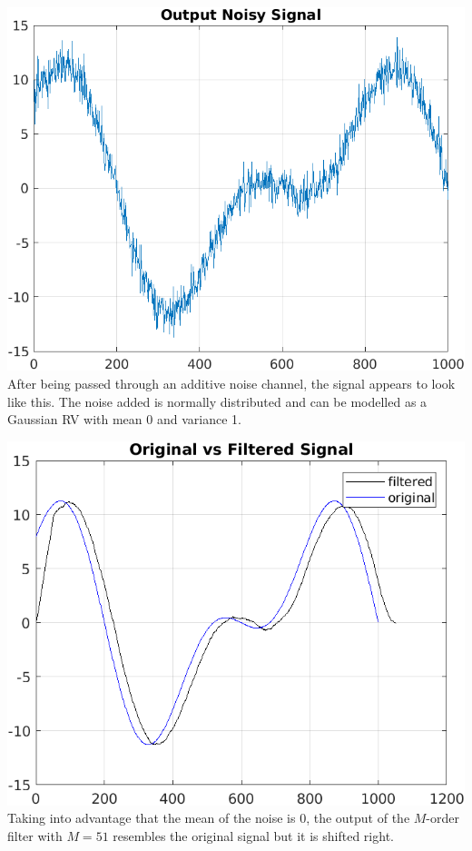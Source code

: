 \documentclass[10pt,twocolumn,letterpaper]{article}
\begin{document}
\begin{center}
    \includegraphics[scale=0.55]{NoisyOutput.png}\\
    After being passed through an additive noise channel, the signal appears to look like this. The noise added is normally distributed and can be modelled as a Gaussian RV with mean 0 and variance 1. 
\end{center} \vskip 0.2cm

\begin{center}
    \includegraphics[scale=0.6]{OrginalvsFiltered.png}\\
    Taking into advantage that the mean of the noise is 0, the output of the $M$-order filter with $M=51$ resembles the original signal but it is shifted right. 
\end{center} \vskip 0.2cm
\end{document}
